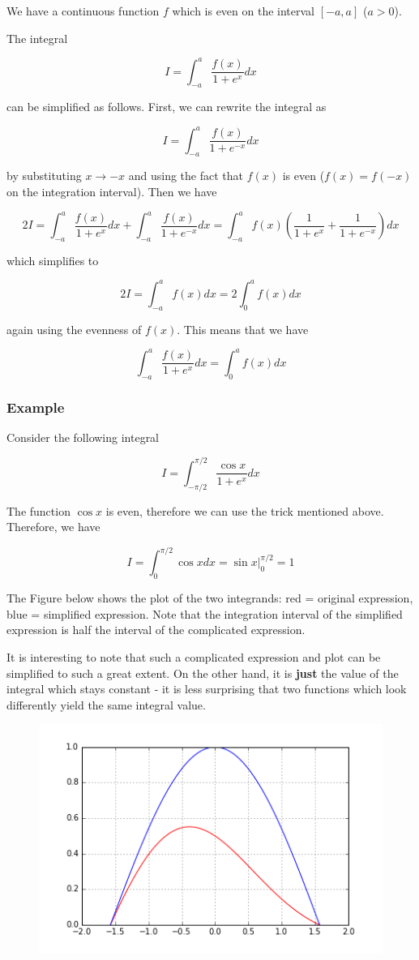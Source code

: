 
We have a continuous function \(f\) which is even on the interval
\([-a, a]\) (\(a>0\)).

The integral

\[
I = \int_{-a}^a \frac{f(x)}{1 + e^x} dx
\]

can be simplified as follows. First, we can rewrite the integral as

\[
I = \int_{-a}^a \frac{f(x)}{1 + e^{-x}} dx
\]

by substituting \(x \rightarrow -x\) and using the fact that \(f(x)\) is
even (\(f(x) = f(-x)\) on the integration interval). Then we have

\[
2I = \int_{-a}^a \frac{f(x)}{1 + e^x} dx + \int_{-a}^a \frac{f(x)}{1 + e^{-x}} dx = \int_{-a}^a f(x) \left( \frac{1}{1 + e^x} + \frac{1}{1 + e^{-x}} \right) dx
\]

which simplifies to

\[
2I =  \int_{-a}^a f(x) dx = 2 \int_{0}^a f(x) dx
\]

again using the evenness of \(f(x)\). This means that we have

\[
\int_{-a}^a \frac{f(x)}{1 + e^x} dx = \int_{0}^a f(x) dx
\]

\subsubsection{Example}

Consider the following integral

\[
I = \int_{-\pi/2}^{\pi/2} \frac{\cos x}{1+e^{x}} dx
\]

The function \(\cos x\) is even, therefore we can use the trick
mentioned above. Therefore, we have

\[
I = \int_0^{\pi/2} \cos x dx = \sin x \Big|_0^{\pi/2} = 1
\]

The Figure below shows the plot of the two integrands: red = original
expression, blue = simplified expression. Note that the integration
interval of the simplified expression is half the interval of the
complicated expression.

It is interesting to note that such a complicated expression and plot
can be simplified to such a great extent. On the other hand, it is
\textbf{just} the value of the integral which stays constant - it is
less surprising that two functions which look differently yield the same
integral value.

\begin{figure}
\centering
\includegraphics{images/integration-symmetries.png}
\end{figure}
